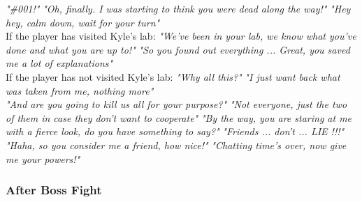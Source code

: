 \begin{dialogue}
	
	 \textit{"\#001!"}
	  \textit{"Oh, finally. I was starting to think you were dead along the way!"}
	 
	 \textit{"Hey hey, calm down, wait for your turn"}\\
	
	If the player has visited Kyle's lab:
	 \textit{"We've been in your lab, we know what you've done and what you are up to!"}
	 \textit{"So you found out everything ... Great, you saved me a lot of explanations"}\\
	
	If the player has not visited Kyle's lab:
	 \textit{"Why all this?"}
	 \textit{"I just want back what was taken from me, nothing more"}\\
	
	 \textit{"And are you going to kill us all for your purpose?"}
	 \textit{"Not everyone, just the two of them in case they don't want to cooperate" }
	 \textit{"By the way, you are staring at me with a fierce look, do you have something to say?" }
	  \textit{"Friends ... don't ... LIE !!!"} 
	 \textit{"Haha, so you consider me a friend, how nice!"}
	 
	 \textit{"Chatting time's over, now give me your powers!"}
	
\end{dialogue}

\subsubsection{After Boss Fight}
\vspace*{0.3cm}

